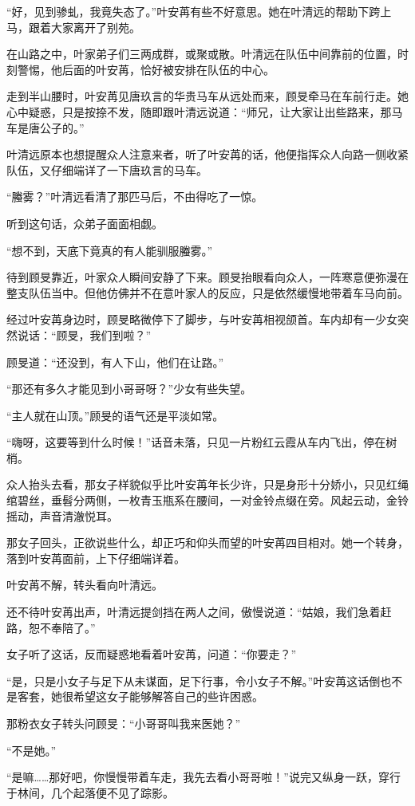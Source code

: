“好，见到骖虬，我竟失态了。”叶安苒有些不好意思。她在叶清远的帮助下跨上马，跟着大家离开了别苑。

在山路之中，叶家弟子们三两成群，或聚或散。叶清远在队伍中间靠前的位置，时刻警惕，他后面的叶安苒，恰好被安排在队伍的中心。

走到半山腰时，叶安苒见唐玖言的华贵马车从远处而来，顾旻牵马在车前行走。她心中疑惑，只是按捺不发，随即跟叶清远说道：“师兄，让大家让出些路来，那马车是唐公子的。”

叶清远原本也想提醒众人注意来者，听了叶安苒的话，他便指挥众人向路一侧收紧队伍，又仔细端详了一下唐玖言的马车。

“螣雾？”叶清远看清了那匹马后，不由得吃了一惊。

听到这句话，众弟子面面相觑。

“想不到，天底下竟真的有人能驯服螣雾。”

待到顾旻靠近，叶家众人瞬间安静了下来。顾旻抬眼看向众人，一阵寒意便弥漫在整支队伍当中。但他仿佛并不在意叶家人的反应，只是依然缓慢地带着车马向前。

经过叶安苒身边时，顾旻略微停下了脚步，与叶安苒相视颌首。车内却有一少女突然说话：“顾旻，我们到啦？”

顾旻道：“还没到，有人下山，他们在让路。”

“那还有多久才能见到小哥哥呀？”少女有些失望。

“主人就在山顶。”顾旻的语气还是平淡如常。

“嗨呀，这要等到什么时候！”话音未落，只见一片粉红云霞从车内飞出，停在树梢。

众人抬头去看，那女子样貌似乎比叶安苒年长少许，只是身形十分娇小，只见红绳绾碧丝，垂髫分两侧，一枚青玉瓶系在腰间，一对金铃点缀在旁。风起云动，金铃摇动，声音清澈悦耳。

那女子回头，正欲说些什么，却正巧和仰头而望的叶安苒四目相对。她一个转身，落到叶安苒面前，上下仔细端详着。

叶安苒不解，转头看向叶清远。

还不待叶安苒出声，叶清远提剑挡在两人之间，傲慢说道：“姑娘，我们急着赶路，恕不奉陪了。”

女子听了这话，反而疑惑地看着叶安苒，问道：“你要走？”

“是，只是小女子与足下从未谋面，足下行事，令小女子不解。”叶安苒这话倒也不是客套，她很希望这女子能够解答自己的些许困惑。

那粉衣女子转头问顾旻：“小哥哥叫我来医她？”

“不是她。”

“是嘛……那好吧，你慢慢带着车走，我先去看小哥哥啦！”说完又纵身一跃，穿行于林间，几个起落便不见了踪影。

